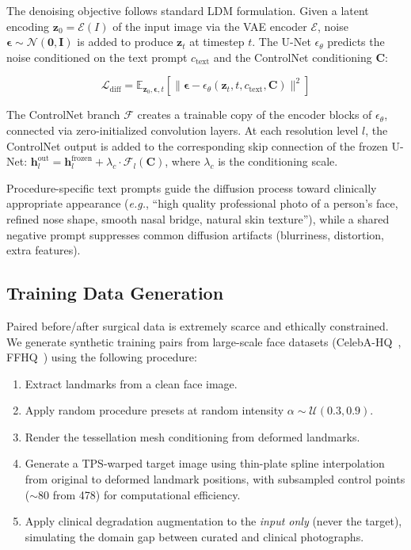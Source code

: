 \documentclass[runningheads]{llncs}
\newcommand{\eg}{\textit{e.g.}}
\begin{document}
The denoising objective follows standard LDM formulation.  Given a latent
encoding $\mathbf{z}_0 = \mathcal{E}(I)$ of the input image via the VAE
encoder $\mathcal{E}$, noise $\boldsymbol{\epsilon} \sim
\mathcal{N}(\mathbf{0}, \mathbf{I})$ is added to produce
$\mathbf{z}_t$ at timestep $t$.  The U-Net $\epsilon_\theta$ predicts
the noise conditioned on the text prompt $c_\text{text}$ and the
ControlNet conditioning $\mathbf{C}$:

\begin{equation}
\label{eq:ldm}
\mathcal{L}_\text{diff} = \mathbb{E}_{\mathbf{z}_0, \boldsymbol{\epsilon},
t}\!\left[\|\boldsymbol{\epsilon} - \epsilon_\theta(\mathbf{z}_t, t,
c_\text{text}, \mathbf{C})\|^2\right]
\end{equation}

The ControlNet branch $\mathcal{F}$ creates a trainable copy of the
encoder blocks of $\epsilon_\theta$, connected via zero-initialized
convolution layers.  At each resolution level $l$, the ControlNet output
is added to the corresponding skip connection of the frozen U-Net:
$\mathbf{h}_l^{\text{out}} = \mathbf{h}_l^{\text{frozen}} + \lambda_c
\cdot \mathcal{F}_l(\mathbf{C})$, where $\lambda_c$ is the conditioning
scale.

Procedure-specific text prompts guide the diffusion process toward
clinically appropriate appearance (\eg, ``high quality professional
photo of a person's face, refined nose shape, smooth nasal bridge,
natural skin texture''), while a shared negative prompt suppresses common
diffusion artifacts (blurriness, distortion, extra features).

\subsection{Training Data Generation}
\label{sec:training_data}

Paired before/after surgical data is extremely scarce and ethically
constrained.  We generate synthetic training pairs from large-scale face
datasets (CelebA-HQ~\cite{karras2018celeba}, FFHQ~\cite{karras2019ffhq})
using the following procedure:

\begin{enumerate}
    \item Extract landmarks from a clean face image.
    \item Apply random procedure presets at random intensity
    $\alpha \sim \mathcal{U}(0.3, 0.9)$.
    \item Render the tessellation mesh conditioning from deformed landmarks.
    \item Generate a TPS-warped target image using thin-plate spline
    interpolation from original to deformed landmark positions, with
    subsampled control points ($\sim$80 from 478) for computational
    efficiency.
    \item Apply clinical degradation augmentation to the \emph{input only}
    (never the target), simulating the domain gap between curated and
    clinical photographs.
\end{enumerate}
\end{document}

